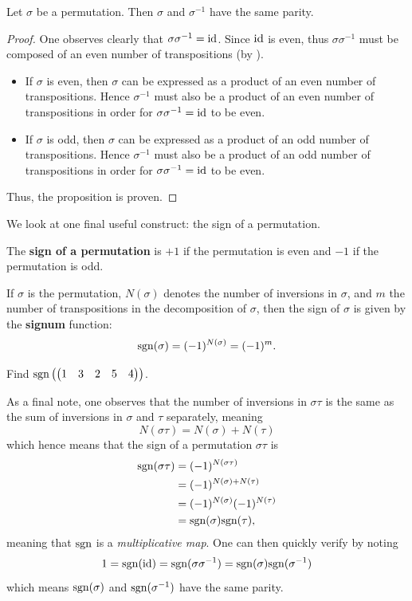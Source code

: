 \newpage

\begin{proposition}\label{prop-permutation-and-inverse-have-same-parity}
    Let $\sigma$ be a permutation. Then $\sigma$ and $\sigma^{-1}$ have the same parity.
\end{proposition}
\begin{proof}
    One observes clearly that $\sigma\sigma^{-1} = \mathrm{id}$. Since $\mathrm{id}$ is even, thus $\sigma\sigma^{-1}$ must be composed of an even number of transpositions (by ).
    \begin{itemize}
        \item If $\sigma$ is even, then $\sigma$ can be expressed as a product of an even number of transpositions. Hence $\sigma^{-1}$ must also be a product of an even number of transpositions in order for $\sigma\sigma^{-1} = \mathrm{id}$ to be even.
        \item If $\sigma$ is odd, then $\sigma$ can be expressed as a product of an odd number of transpositions. Hence $\sigma^{-1}$ must also be a product of an odd number of transpositions in order for $\sigma\sigma^{-1} = \mathrm{id}$ to be even.
    \end{itemize}
    Thus, the proposition is proven.
\end{proof}

We look at one final useful construct: the sign of a permutation.
\begin{definition}
    The \textbf{sign of a permutation} is $+1$ if the permutation is even and $-1$ if the permutation is odd.
\end{definition}
If $\sigma$ is the permutation, $N(\sigma)$ denotes the number of inversions in $\sigma$, and $m$ the number of transpositions in the decomposition of $\sigma$, then the sign of $\sigma$ is given by the \textbf{signum} function:
\[
    \mathrm{sgn}(\sigma) = (-1)^{N(\sigma)} = (-1)^m.
\]
\begin{exercise}
    Find $\mathrm{sgn}\left(\begin{pmatrix}1&3&2&5&4\end{pmatrix}\right)$.
\end{exercise}

As a final note, one observes that the number of inversions in $\sigma\tau$ is the same as the sum of inversions in $\sigma$ and $\tau$ separately, meaning
\[
    N(\sigma\tau) = N(\sigma) + N(\tau)
\]
which hence means that the sign of a permutation $\sigma\tau$ is
\begin{align*}
    \mathrm{sgn}(\sigma\tau) &= (-1)^{N(\sigma\tau)}\\
    &= (-1)^{N(\sigma) + N(\tau)}\\
    &= (-1)^{N(\sigma)}(-1)^{N(\tau)}\\
    &= \mathrm{sgn}(\sigma)\mathrm{sgn}(\tau),
\end{align*}
meaning that $\mathrm{sgn}$ is a \textit{multiplicative map}. One can then quickly verify  by noting
\[
    1 = \mathrm{sgn}(\mathrm{id}) = \mathrm{sgn}(\sigma\sigma^{-1}) = \mathrm{sgn}(\sigma)\mathrm{sgn}(\sigma^{-1})
\]
which means $\mathrm{sgn}(\sigma)$ and $\mathrm{sgn}(\sigma^{-1})$ have the same parity.

